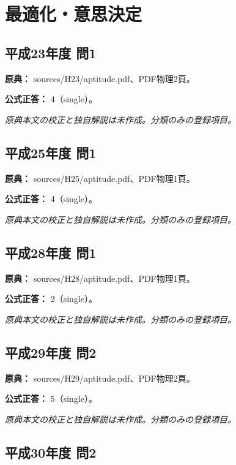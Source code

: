 \section{最適化・意思決定}

\subsection{平成23年度 問1}
\label{q:h23-reg-apt-01}

\noindent\textbf{原典：} sources/H23/aptitude.pdf、PDF物理2頁。

\textbf{公式正答：} 4（single）。

\par\textit{原典本文の校正と独自解説は未作成。分類のみの登録項目。}

\subsection{平成25年度 問1}
\label{q:h25-reg-apt-01}

\noindent\textbf{原典：} sources/H25/aptitude.pdf、PDF物理1頁。

\textbf{公式正答：} 4（single）。

\par\textit{原典本文の校正と独自解説は未作成。分類のみの登録項目。}

\subsection{平成28年度 問1}
\label{q:h28-reg-apt-01}

\noindent\textbf{原典：} sources/H28/aptitude.pdf、PDF物理1頁。

\textbf{公式正答：} 2（single）。

\par\textit{原典本文の校正と独自解説は未作成。分類のみの登録項目。}

\subsection{平成29年度 問2}
\label{q:h29-reg-apt-02}

\noindent\textbf{原典：} sources/H29/aptitude.pdf、PDF物理2頁。

\textbf{公式正答：} 5（single）。

\par\textit{原典本文の校正と独自解説は未作成。分類のみの登録項目。}

\subsection{平成30年度 問2}
\label{q:h30-reg-apt-02}

